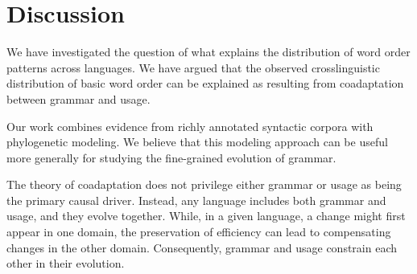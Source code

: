 \documentclass[11pt,a4paper]{article}
\begin{document}






\section*{Discussion}

We have investigated the question of what explains the distribution of word order patterns across languages.
We have argued that the observed crosslinguistic distribution of basic word order can be explained as resulting from coadaptation between grammar and usage.

Our work combines evidence from richly annotated syntactic corpora with phylogenetic modeling. We believe that this modeling approach can be useful more generally for studying the fine-grained evolution of grammar.

The theory of coadaptation does not privilege either grammar or usage as being the primary causal driver.
Instead, any language includes both grammar and usage, and they evolve together.
While, in a given language, a change might first appear in one domain, the preservation of efficiency can lead to compensating changes in the other domain.
Consequently, grammar and usage constrain each other in their evolution.
\end{document}
